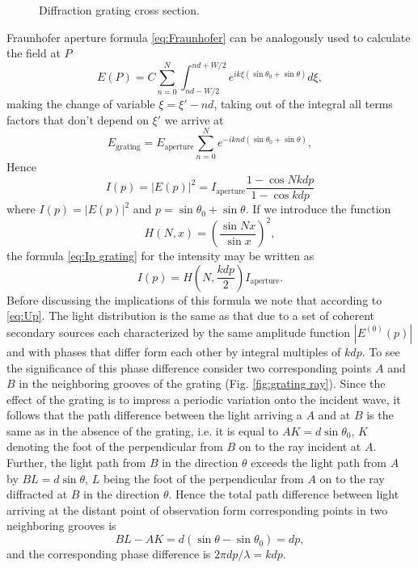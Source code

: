 \documentclass[12pt,twoside,english]{book}
\renewcommand{\~}{\perispomeni}%
\numberwithin{equation}{section}
\numberwithin{figure}{section}
\begin{document}
\begin{figure}[h]
\center{}
\caption{Diffraction grating cross section.}
\label{fig:grating ex}
\end{figure}
Fraunhofer aperture formula \ref{eq:Fraunhofer} can be analogously used to calculate the field at $P$
\begin{equation}
E\left(P\right)=C\sum_{n=0}^{N}\int_{nd-W/2}^{nd+W/2}e^{ik\xi\left(\sin\theta_{0}+\sin\theta\right)}d\xi,
\end{equation}
making the change of variable $\xi=\xi'-nd$, taking out of the integral all terms factors that don't depend on $\xi'$ we arrive at
\begin{equation}
E_{\text{grating}}=E_{\text{aperture}}\sum_{n=0}^{N}e^{-iknd\left(\sin\theta_{0}+\sin\theta\right)},
\label{eq:Up}
\end{equation}
Hence 
\begin{equation}
I\left(p\right)=\left|E\left(p\right)\right|^{2}=I_{\text{aperture}}\frac{1-\cos Nkdp}{1-\cos kdp}
\label{eq:Ip grating}
\end{equation}
where $I\left(p\right)=\left|E\left(p\right)\right|^{2}$ and $p=\sin\theta_{0}+\sin\theta$. If we introduce the function
\begin{equation}
H\left(N,x\right)=\left(\frac{\sin Nx}{\sin x}\right)^{2},
\end{equation}
the formula \ref{eq:Ip grating} for the intensity may be written as
\begin{equation}
I\left(p\right)=H\left(N,\frac{kdp}{2}\right)I_{\text{aperture}}.
\label{eq:intensity grating}
\end{equation}
Before discussing the implications of this formula we note that according to \ref{eq:Up}. The light distribution is the same as that due to a set of coherent secondary sources each characterized by the same amplitude function $\left|E^{\left(0\right)}\left(p\right)\right|$ and with phases that differ form each other by integral multiples of $kdp$. To see the significance of this phase difference consider two corresponding points $A$ and $B$ in the neighboring grooves of the grating (Fig. \ref{fig:grating ray}). Since the effect of the grating is to impress a periodic variation onto the incident wave, it follows that the path difference between the light arriving a $A$ and at $B$ is the same as in the absence of the grating, i.e. it is equal to $AK=d\sin\theta_{0}$, $K$ denoting the foot of the perpendicular from $B$ on to the ray incident at $A$. Further, the light path from $B$ in the direction $\theta$ exceeds the light path from $A$ by $BL=d\sin\theta$, $L$ being the foot of the perpendicular from $A$ on to the ray diffracted at $B$ in the direction $\theta.$ Hence the total path difference between light arriving at the distant point of observation form corresponding points in two neighboring grooves is
\begin{equation}
BL-AK=d\left(\sin\theta-\sin\theta_{0}\right)=dp,
\label{eq:path difference}
\end{equation}
 and the corresponding phase difference is $2\pi dp/\lambda=kdp$.
\end{document}
